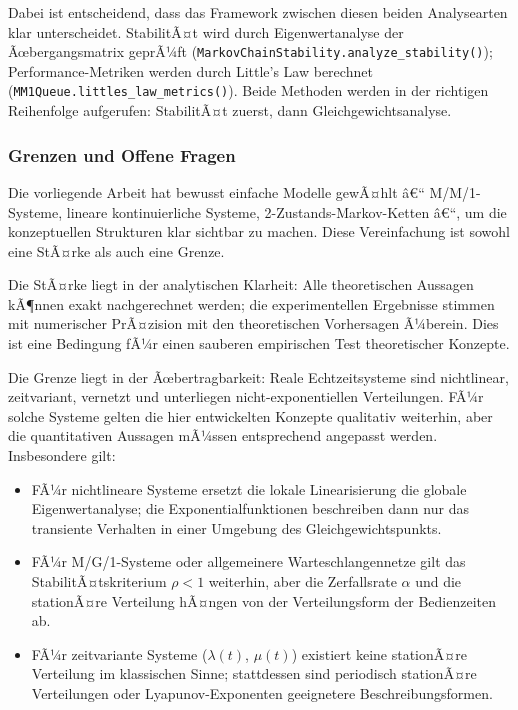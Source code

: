 ﻿\documentclass[a4paper,12pt]{scrreprt}
\theoremstyle{definition}
\begin{document}
Dabei ist entscheidend, dass das Framework zwischen diesen beiden Analysearten
klar unterscheidet.  StabilitÃ¤t wird durch Eigenwertanalyse der
Ãœbergangsmatrix geprÃ¼ft (\texttt{MarkovChainStability.analyze\_stability()});
Performance-Metriken werden durch Little's Law berechnet
(\texttt{MM1Queue.littles\_law\_metrics()}).  Beide Methoden werden in der
richtigen Reihenfolge aufgerufen: StabilitÃ¤t zuerst, dann
Gleichgewichtsanalyse.

\subsubsection{Grenzen und Offene Fragen}

Die vorliegende Arbeit hat bewusst einfache Modelle gewÃ¤hlt â€“ M/M/1-Systeme,
lineare kontinuierliche Systeme, 2-Zustands-Markov-Ketten â€“, um die
konzeptuellen Strukturen klar sichtbar zu machen.  Diese Vereinfachung ist
sowohl eine StÃ¤rke als auch eine Grenze.

Die StÃ¤rke liegt in der analytischen Klarheit: Alle theoretischen Aussagen
kÃ¶nnen exakt nachgerechnet werden; die experimentellen Ergebnisse stimmen
mit numerischer PrÃ¤zision mit den theoretischen Vorhersagen Ã¼berein.  Dies
ist eine Bedingung fÃ¼r einen sauberen empirischen Test theoretischer
Konzepte.

Die Grenze liegt in der Ãœbertragbarkeit: Reale Echtzeitsysteme sind
nichtlinear, zeitvariant, vernetzt und unterliegen nicht-exponentiellen
Verteilungen.  FÃ¼r solche Systeme gelten die hier entwickelten Konzepte
qualitativ weiterhin, aber die quantitativen Aussagen mÃ¼ssen entsprechend
angepasst werden.  Insbesondere gilt:
\begin{itemize}
	\item[-] FÃ¼r nichtlineare Systeme ersetzt die lokale Linearisierung die
	globale Eigenwertanalyse; die Exponentialfunktionen beschreiben
	dann nur das transiente Verhalten in einer Umgebung des
	Gleichgewichtspunkts.
	\item[-] FÃ¼r M/G/1-Systeme oder allgemeinere Warteschlangennetze
	gilt das StabilitÃ¤tskriterium $\rho < 1$ weiterhin, aber die
	Zerfallsrate $\alpha$ und die stationÃ¤re Verteilung hÃ¤ngen von
	der Verteilungsform der Bedienzeiten ab.
	\item[-] FÃ¼r zeitvariante Systeme ($\lambda(t)$, $\mu(t)$) existiert
	keine stationÃ¤re Verteilung im klassischen Sinne; stattdessen
	sind periodisch stationÃ¤re Verteilungen oder
	Lyapunov-Exponenten geeignetere Beschreibungsformen.
\end{itemize}
\end{document}
